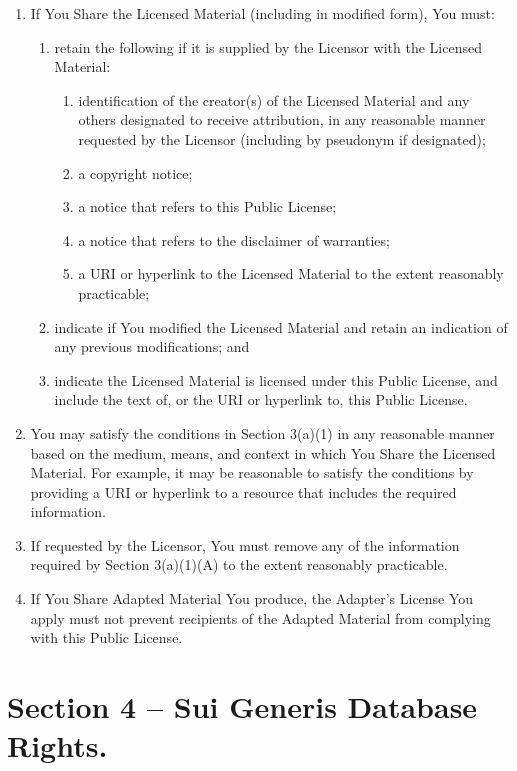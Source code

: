 \documentclass[a4paper, 12pt]{article}
\begin{document}
\begin{enumerate}
\item If You Share the Licensed Material (including in modified form), You must:
\begin{enumerate}[label=\Alph*.]
\item retain the following if it is supplied by the Licensor with the Licensed Material:
\begin{enumerate}[label=\roman*.]
\item identification of the creator(s) of the Licensed Material and any others designated to receive attribution, in any reasonable manner requested by the Licensor (including by pseudonym if designated);
\item a copyright notice;
\item a notice that refers to this Public License;
\item a notice that refers to the disclaimer of warranties;
\item a URI or hyperlink to the Licensed Material to the extent reasonably practicable;
\end{enumerate}
\item indicate if You modified the Licensed Material and retain an indication of any previous modifications; and
\item indicate the Licensed Material is licensed under this Public License, and include the text of, or the URI or hyperlink to, this Public License.
\end{enumerate}
\item You may satisfy the conditions in Section 3(a)(1) in any reasonable manner based on the medium, means, and context in which You Share the Licensed Material. For example, it may be reasonable to satisfy the conditions by providing a URI or hyperlink to a resource that includes the required information.
\item If requested by the Licensor, You must remove any of the information required by Section 3(a)(1)(A) to the extent reasonably practicable.
\item If You Share Adapted Material You produce, the Adapter's License You apply must not prevent recipients of the Adapted Material from complying with this Public License.
\end{enumerate}

\section*{Section 4 – Sui Generis Database Rights.}
\end{document}
